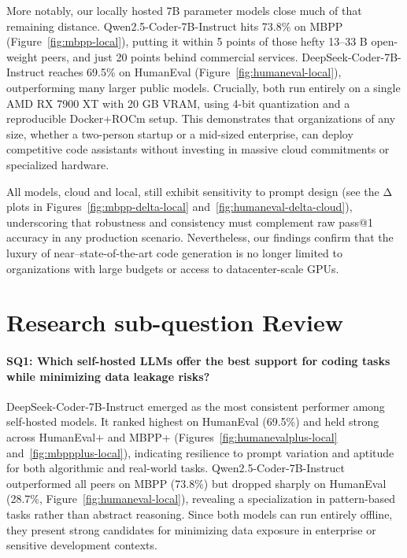More notably, our locally hosted 7B parameter models close much of that remaining distance. Qwen2.5-Coder-7B-Instruct hits 73.8\% on \gls{MBPP} (Figure~\ref{fig:mbpp-local}), putting it within 5 points of those hefty 13--33 B open-weight peers, and just 20 points behind commercial services. DeepSeek-Coder-7B-Instruct reaches 69.5\% on HumanEval (Figure~\ref{fig:humaneval-local}), outperforming many larger public models. Crucially, both run entirely on a single AMD RX 7900 XT with 20 GB VRAM, using 4-bit quantization and a reproducible Docker+ROCm setup. This demonstrates that organizations of any size, whether a two-person startup or a mid-sized enterprise, can deploy competitive code assistants without investing in massive cloud commitments or specialized hardware.

All models, cloud and local, still exhibit sensitivity to prompt design (see the Δ plots in Figures~\ref{fig:mbpp-delta-local} and~\ref{fig:humaneval-delta-cloud}), underscoring that robustness and consistency must complement raw pass@1 accuracy in any production scenario. Nevertheless, our findings confirm that the luxury of near--state-of-the-art code generation is no longer limited to organizations with large budgets or access to datacenter-scale GPUs.

\section{Research sub-question Review}

\paragraph{SQ1: Which self-hosted LLMs offer the best support for coding tasks while minimizing data leakage risks?}
DeepSeek-Coder-7B-Instruct emerged as the most consistent performer among self-hosted models. It ranked highest on HumanEval (69.5\%) and held strong across HumanEval+ and \gls{MBPP}+ (Figures~\ref{fig:humanevalplus-local} and~\ref{fig:mbppplus-local}), indicating resilience to prompt variation and aptitude for both algorithmic and real-world tasks. Qwen2.5-Coder-7B-Instruct outperformed all peers on \gls{MBPP} (73.8\%) but dropped sharply on HumanEval (28.7\%, Figure~\ref{fig:humaneval-local}), revealing a specialization in pattern-based tasks rather than abstract reasoning. Since both models can run entirely offline, they present strong candidates for minimizing data exposure in enterprise or sensitive development contexts.

